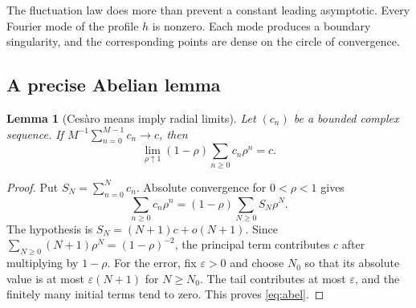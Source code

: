 \documentclass[11pt,letterpaper]{article}
\numberwithin{equation}{section}
\newtheorem{lemma}[theorem]{Lemma}
\theoremstyle{definition}
\theoremstyle{remark}
\begin{document}
The fluctuation law does more than prevent a constant leading asymptotic.
Every Fourier mode of the profile $h$ is nonzero. Each mode produces a
boundary singularity, and the corresponding points are dense on the circle
of convergence.

\subsection{A precise Abelian lemma}
\begin{lemma}[Ces\`aro means imply radial limits]\label{lem:abel}
Let $(c_n)$ be a bounded complex sequence. If
$M^{-1}\sum_{n=0}^{M-1}c_n\to c$, then
\begin{equation}\label{eq:abel}
 \lim_{\rho\uparrow1}(1-\rho)\sum_{n\ge0}c_n\rho^n=c.
\end{equation}
\end{lemma}
\begin{proof}
Put $S_N=\sum_{n=0}^Nc_n$. Absolute convergence for $0<\rho<1$ gives
\[
 \sum_{n\ge0}c_n\rho^n=(1-\rho)\sum_{N\ge0}S_N\rho^N.
\]
The hypothesis is $S_N=(N+1)c+o(N+1)$. Since
$\sum_{N\ge0}(N+1)\rho^N=(1-\rho)^{-2}$, the principal term contributes
$c$ after multiplying by $1-\rho$. For the error, fix $\varepsilon>0$ and
choose $N_0$ so that its absolute value is at most
$\varepsilon(N+1)$ for $N\ge N_0$. The tail contributes at most
$\varepsilon$, and the finitely many initial terms tend to zero. This
proves \eqref{eq:abel}.
\end{proof}
\end{document}
